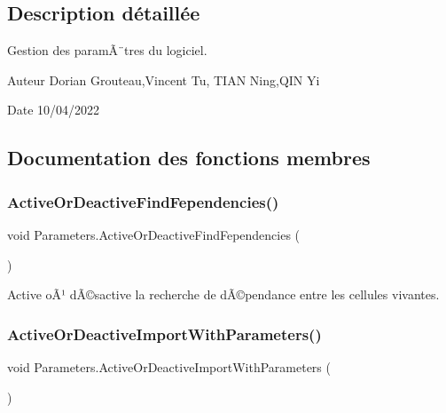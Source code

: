 \subsection{Description détaillée}
Gestion des paramÃ¨tres du logiciel. 

\begin{DoxyAuthor}{Auteur}
Dorian Grouteau,Vincent Tu, T\+I\+AN Ning,Q\+IN Yi 
\end{DoxyAuthor}
\begin{DoxyDate}{Date}
10/04/2022 
\end{DoxyDate}


\subsection{Documentation des fonctions membres}
\mbox{\label{class_parameters_a23cd831787b627f7ec96da88a774838d}} 
\subsubsection{\texorpdfstring{Active\+Or\+Deactive\+Find\+Fependencies()}{ActiveOrDeactiveFindFependencies()}}
{\footnotesize\ttfamily void Parameters.\+Active\+Or\+Deactive\+Find\+Fependencies (\begin{DoxyParamCaption}{ }\end{DoxyParamCaption})\hspace{0.3cm}{\ttfamily [inline]}}



Active oÃ¹ dÃ©sactive la recherche de dÃ©pendance entre les cellules vivantes. 

\mbox{\label{class_parameters_a4566221c7993c122d2d32682530f1083}} 
\subsubsection{\texorpdfstring{Active\+Or\+Deactive\+Import\+With\+Parameters()}{ActiveOrDeactiveImportWithParameters()}}
{\footnotesize\ttfamily void Parameters.\+Active\+Or\+Deactive\+Import\+With\+Parameters (\begin{DoxyParamCaption}{ }\end{DoxyParamCaption})\hspace{0.3cm}{\ttfamily [inline]}}



